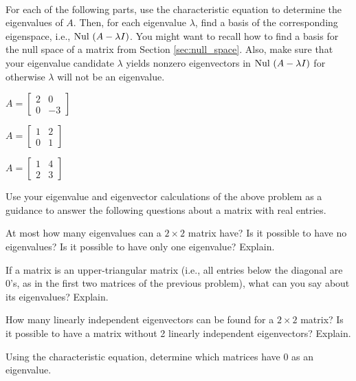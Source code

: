 \begin{pa} \label{pa:4_b} ~

\be
\item For each of the following parts, use the characteristic equation to determine the eigenvalues of $A$. Then, for each eigenvalue $\lambda$, find a basis of the corresponding eigenspace, i.e., $\text{Nul }(A-\lambda I)$. You might want to recall how to find a basis for the null space of a matrix from Section \ref{sec:null_space}. Also, make sure that your eigenvalue candidate $\lambda$ yields nonzero eigenvectors in $\text{Nul }(A-\lambda I)$ for otherwise $\lambda$ will not be an eigenvalue.

	\ba
	\begin{minipage}{1.5in} 
	\item $A=\left[ \begin{array}{cr} 2 &0 \\ 0 & -3 \end{array}\right]$
	\end{minipage}
	\begin{minipage}{1.5in} 
	\item $A=\left[ \begin{array}{cc} 1 & 2 \\ 0 & 1 \end{array}\right]$
	\end{minipage}
	\begin{minipage}{1.5in} 
	\item $A=\left[ \begin{array}{cc} 1 & 4 \\2 & 3 \end{array}\right]$
	\end{minipage}

\ea

\item Use your eigenvalue and eigenvector calculations of the above problem as a guidance to answer the following questions about a matrix with real entries.

\ba
	\item At most how many eigenvalues can a $2\times 2$ matrix have? Is it possible to have no eigenvalues? Is it possible to have only one eigenvalue? Explain.
	
\item If a matrix is an upper-triangular matrix (i.e., all entries below the diagonal are 0's, as in the first two matrices of the previous problem), what can you say about its eigenvalues? Explain.


\item How many linearly independent eigenvectors can be found for a $2\times 2$ matrix? Is it possible to have a matrix without 2 linearly independent eigenvectors? Explain.

\ea

\item Using the characteristic equation, determine which matrices have 0 as an eigenvalue.

\ee

\end{pa}



